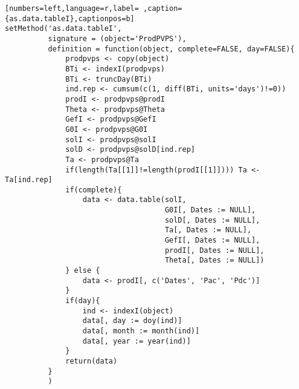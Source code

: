 \begin{lstlisting}[numbers=left,language=r,label= ,caption={as.data.tableI},captionpos=b]
setMethod('as.data.tableI',
          signature = (object='ProdPVPS'),
          definition = function(object, complete=FALSE, day=FALSE){
              prodpvps <- copy(object)
              BTi <- indexI(prodpvps)
              BTi <- truncDay(BTi)
              ind.rep <- cumsum(c(1, diff(BTi, units='days')!=0))
              prodI <- prodpvps@prodI
              Theta <- prodpvps@Theta
              GefI <- prodpvps@GefI
              G0I <- prodpvps@G0I
              solI <- prodpvps@solI
              solD <- prodpvps@solD[ind.rep]
              Ta <- prodpvps@Ta
              if(length(Ta[[1]]!=length(prodI[[1]]))) Ta <- Ta[ind.rep]
              if(complete){
                  data <- data.table(solI,
                                     G0I[, Dates := NULL],
                                     solD[, Dates := NULL],
                                     Ta[, Dates := NULL],
                                     GefI[, Dates := NULL],
                                     prodI[, Dates := NULL],
                                     Theta[, Dates := NULL])
              } else {
                  data <- prodI[, c('Dates', 'Pac', 'Pdc')]
              }
              if(day){
                  ind <- indexI(object)
                  data[, day := doy(ind)]
                  data[, month := month(ind)]
                  data[, year := year(ind)]
              }
              return(data)
          }
          )
\end{lstlisting}
